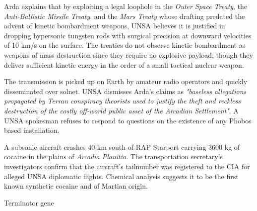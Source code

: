 Arda explains that by exploiting a legal loophole in the {\it Outer Space Treaty}, the {\it Anti-Ballistic Missile Treaty}, and the {\it Mars Treaty} whose drafting predated the advent of kinetic bombardment weapons, UNSA believes it is justified in dropping hypersonic tungsten rods with surgical precision at downward velocities of 10 km/s on the surface. The treaties do not observe kinetic bombardment as weapons of mass destruction since they require no explosive payload, though they deliver sufficient kinetic energy in the order of a small tactical nuclear weapon.

The transmission is picked up on Earth by amateur radio operators and quickly disseminated over solnet. UNSA dismisses Arda's claims as {\it "baseless allegations propagated by Terran conspiracy theorists used to justify the theft and reckless destruction of the costly off-world public asset of the Arcadian Settlement"}. A UNSA spokesman refuses to respond to questions on the existence of any Phobos based installation.
\StopTimelineDate

A subsonic aircraft crashes 40 km south of RAP Starport carrying 3600 kg of cocaine in the plains of {\it Arcadia Planitia}. The transportation secretary's investigators confirm that the aircraft's tailnumber was registered to the CIA for alleged UNSA diplomatic flights. Chemical analysis suggests it to be the first known synthetic cocaine and of Martian origin.
\StopTimelineDate

Terminator gene

\stoplines

\StopChapter


